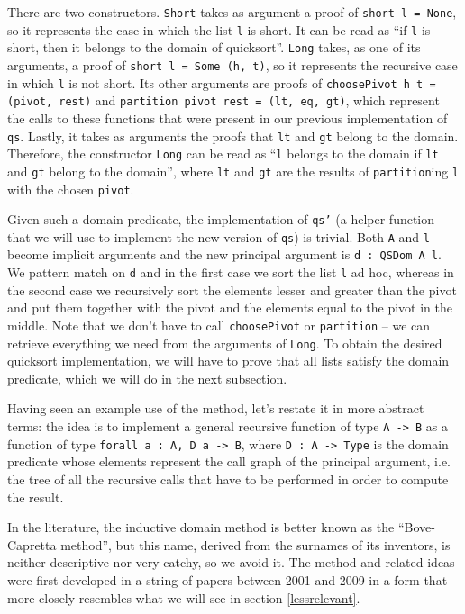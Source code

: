 \documentclass[declaration,mgr,english,shortabstract]{iithesis}
\newcommand{\m}[1]{\texttt{#1}}
\begin{document}
There are two constructors. \m{Short} takes as argument a proof of \m{short l = None}, so it represents the case in which the list \m{l} is short. It can be read as ``if \m{l} is short, then it belongs to the domain of quicksort''. \m{Long} takes, as one of its arguments, a proof of \m{short l = Some (h, t)}, so it represents the recursive case in which \m{l} is not short. Its other arguments are proofs of \m{choosePivot h t = (pivot, rest)} and \m{partition pivot rest = (lt, eq, gt)}, which represent the calls to these functions that were present in our previous implementation of \m{qs}. Lastly, it takes as arguments the proofs that \m{lt} and \m{gt} belong to the domain. Therefore, the constructor \m{Long} can be read as ``\m{l} belongs to the domain if \m{lt} and \m{gt} belong to the domain'', where \m{lt} and \m{gt} are the results of \m{partition}ing \m{l} with the chosen \m{pivot}.

Given such a domain predicate, the implementation of \m{qs'} (a helper function that we will use to implement the new version of \m{qs}) is trivial. Both \m{A} and \m{l} become implicit arguments and the new principal argument is \m{d\ :\ QSDom A l}. We pattern match on \m{d} and in the first case we sort the list \m{l} ad hoc, whereas in the second case we recursively sort the elements lesser and greater than the pivot and put them together with the pivot and the elements equal to the pivot in the middle. Note that we don't have to call \m{choosePivot} or \m{partition} -- we can retrieve everything we need from the arguments of \m{Long}. To obtain the desired quicksort implementation, we will have to prove that all lists satisfy the domain predicate, which we will do in the next subsection.

Having seen an example use of the method, let's restate it in more abstract terms: the idea is to implement a general recursive function of type \m{A -> B} as a function of type \m{forall a\ :\ A, D a -> B}, where \m{D\ :\ A -> Type} is the domain predicate whose elements represent the call graph of the principal argument, i.e. the tree of all the recursive calls that have to be performed in order to compute the result.

In the literature, the inductive domain method is better known as the ``Bove-Capretta method'', but this name, derived from the surnames of its inventors, is neither descriptive nor very catchy, so we avoid it. The method and related ideas were first developed in a string of papers between 2001 and 2009 \cite{BCM1} \cite{BCM2} \cite{BCM3} \cite{BCM4} \cite{BCM5} \cite{BCM6} \cite{BCM7} \cite{BCM8} \cite{BCM9} in a form that more closely resembles what we will see in section \ref{lessrelevant}.
\end{document}

